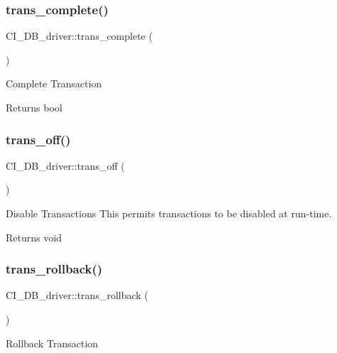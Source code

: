\subsubsection{\texorpdfstring{trans\+\_\+complete()}{trans\_complete()}}
{\footnotesize\ttfamily C\+I\+\_\+\+D\+B\+\_\+driver\+::trans\+\_\+complete (\begin{DoxyParamCaption}{ }\end{DoxyParamCaption})}

Complete Transaction

\begin{DoxyReturn}{Returns}
bool 
\end{DoxyReturn}
\mbox{\label{class_c_i___d_b__driver_ab5b1f3fec061ad1272f0003cdefbb465}} 
\subsubsection{\texorpdfstring{trans\+\_\+off()}{trans\_off()}}
{\footnotesize\ttfamily C\+I\+\_\+\+D\+B\+\_\+driver\+::trans\+\_\+off (\begin{DoxyParamCaption}{ }\end{DoxyParamCaption})}

Disable Transactions This permits transactions to be disabled at run-\/time.

\begin{DoxyReturn}{Returns}
void 
\end{DoxyReturn}
\mbox{\label{class_c_i___d_b__driver_a169cc233f9785219d0f281634527b65a}} 
\subsubsection{\texorpdfstring{trans\+\_\+rollback()}{trans\_rollback()}}
{\footnotesize\ttfamily C\+I\+\_\+\+D\+B\+\_\+driver\+::trans\+\_\+rollback (\begin{DoxyParamCaption}{ }\end{DoxyParamCaption})}

Rollback Transaction

